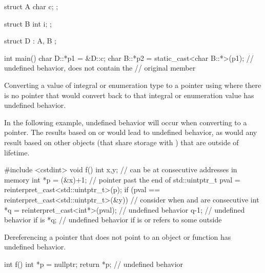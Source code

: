 \pnum
\begin{example}
\begin{codeblock}
struct A {
  char c;
};

struct B {
  int i;
};

struct D : A, B {};

int main() {
  char D::*p1 = &D::c;
  char B::*p2 = static_cast<char B::*>(p1); // undefined behavior,  does not contain the
                                            // original member 
}
\end{codeblock}
\end{example}


\pnum
Converting a value of integral or enumeration type
to a pointer using 
where there is no pointer
that would convert back
to that integral or enumeration value
has undefined behavior.

\pnum
\begin{example}
In the following example,
undefined behavior will occur
when converting  to a pointer.
The results based on
 or 
would lead to undefined behavior,
as would any result based on
other objects (that share storage with )
that are outside of lifetime.
\begin{codeblock}
#include <cstdint>
void f()
{
  int x,y;          // can be at consecutive addresses in memory
  int *p = (&x)+1;  // pointer past the end of 
  std::uintptr_t pval = reinterpret_cast<std::uintptr_t>(p);
  if (pval == reinterpret_cast<std::uintptr_t>(&y)) {   // consider when  and  are consecutive
    int *q = reinterpret_cast<int*>(pval);  // undefined behavior
    q-1;                            // undefined behavior if  is 
    *q;                             // undefined behavior if  is  or refers to some  outside 
  }
}
\end{codeblock}
\end{example}


\pnum
Dereferencing a pointer that does not point to an object or function
has undefined behavior.

\pnum
\begin{example}
\begin{codeblock}
int f()
{
  int *p = nullptr;
  return *p;    // undefined behavior
}
\end{codeblock}
\end{example}

